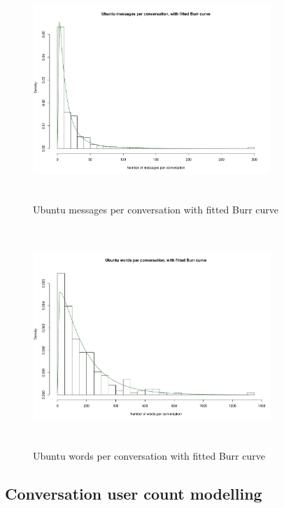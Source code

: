 \documentclass[conference]{IEEEtran}
\begin{document}
\begin{figure}
\begin{center}
\includegraphics[height=8.3cm, width=9cm]{13_messages_ubuntu.pdf} 
\caption{Ubuntu messages per conversation with fitted Burr curve}
\end{center}
\label{fig:interarrival_ubun}
\end{figure}

\begin{figure}
\begin{center}
\includegraphics[height=8.3cm, width=9cm]{14_words_ubuntu.pdf} 
\caption{Ubuntu words per conversation with fitted Burr curve}
\end{center}
\label{fig:interarrival_ubun}
\end{figure}


\subsection{Conversation user count modelling}
\end{document}
